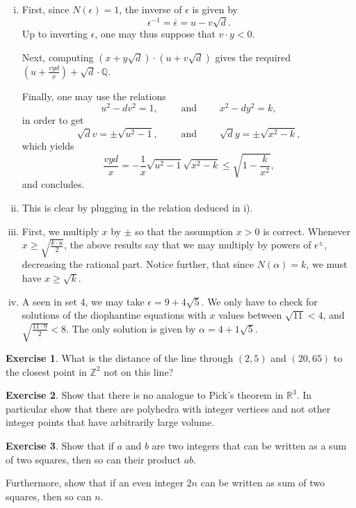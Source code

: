 \documentclass[12pt,a4paper]{article}
\theoremstyle{plain}
\newtheorem*{Sol*}{Solution}
\theoremstyle{definition}
\newtheorem{Ex}{Exercise}
\def \N {\mathbb N}
\def \Q {\mathbb Q}
\def \Z {\mathbb Z}
\newif\ifsolutions
\newcommand{\exercise}[2]{
			\begin{Ex} #1 \end{Ex}
			\ifsolutions  \begin{Sol*} #2 \end{Sol*} \bigskip \else \bigskip  \fi
		}
\begin{document}
{
	\begin{enumerate}[i)]
		\item 
		First, since $N(\epsilon)=1$, the inverse of $\epsilon$ is given by
			\[ \epsilon^{-1} = \overline{\epsilon} = u - v \sqrt{d}. \]
		Up to inverting $\epsilon$, one may thus suppose that $v \cdot y < 0$.

		Next, computing $(x+y\sqrt{d}) \cdot (u+v \sqrt{d})$ gives the required $\left(u+ \frac{vyd}{x} \right) + \sqrt{d} \cdot \Q$.

		Finally, one may use the relations
			\[ u^2 - dv^2 = 1, \qquad \text{ and } \qquad x^2 - dy^2 = k,\]
		in order to get
			\[ \sqrt{d} v = \pm \sqrt{u^2 - 1}, \qquad \text{ and } \qquad \sqrt{d} y = \pm \sqrt{x^2 - k}, \]
		which yields
			\[ \frac{vyd}{x} = - \frac1x \sqrt{u^2 - 1} \sqrt{x^2 - k} \leq \sqrt{1 - \frac{k}{x^2}}, \]
		and concludes.
		
		\item
		This is clear by plugging in the relation deduced in i).

		\item 
		First, we multiply $x$ by $\pm$ so that the assumption $x > 0$ is correct.
		Whenever $x \geq \sqrt{\frac{k \cdot u}{2}}$, the above results say that we may multiply by powers of $\epsilon^\pm$, decreasing the rational part.
		Notice further, that since $N(\alpha)=k$, we must have $x \geq \sqrt{k}$.

		\item
		A seen in set 4, we may take $\epsilon = 9 + 4\sqrt{5}$.
		We only have to check for solutions of the diophantine equations with $x$ values between $\sqrt{11} < 4$, and $\sqrt{\frac{11 \cdot 9}2} < 8$.
		The only solution is given by $\alpha = 4 + 1\sqrt{5}$.
	\end{enumerate}

}

\exercise{
 What is the distance of the line
through $(2,5)$ and $(20, 65)$ to the closest
point in $\mathbb{Z}^2$ not on this line?

}
{}

\exercise{
	 Show that there is no analogue to Pick's theorem in $\mathbb{R}^3$. In particular show that there are polyhedra with integer vertices and not other integer points that have arbitrarily large volume.

}
{
	These are given by the \emph{Reeve tetrahedra}.
	Its vertices are given by $0, (1,0,0), (0,1,0)$, and $(1,1,N)$, where $N \in \N$ is a large positive integer.
}

\exercise{ 
	Show that if $a$ and $b$ are two integers that can be written as a sum of two squares, then so can their product $ab$.	

	Furthermore, show that if an even integer $2n$ can be written as sum of two squares, then so can $n$.
}
{
	Firstly, a number is a sum of two squares if and only if it is the norm of a Gaussian integer (element of $\Z[i]$).
	Since $N(z \cdot w) = N(z) \cdot N(w)$, we conclude.

	Secondly, if $2n = a^2 + b^2$, then $a, b$ must have same parity.
	As such,
		\[ n = \left(\frac{a+b}2 \right)^2 + \left(\frac{a-b}2 \right)^2, \]
	and $n$ is the sum of two squares.
}
\end{document}
